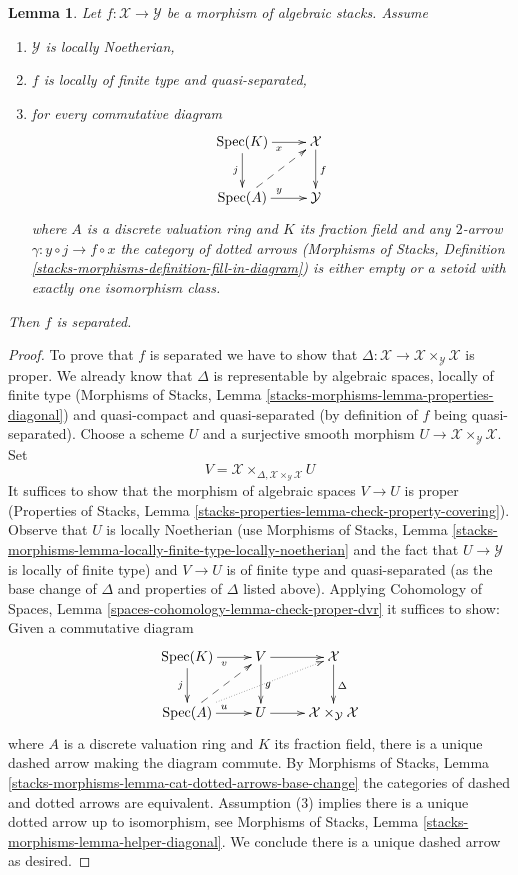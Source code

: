 \documentclass[10pt,a4paper]{amsart}
\theoremstyle{plain}
\newtheorem{lemma}[subsection]{Lemma}
\theoremstyle{definition}
\theoremstyle{remark}
\numberwithin{equation}{subsection}
\def\Spec{\mathop{\mathrm{Spec}}}
\begin{document}
\begin{lemma}
\label{lemma-check-separated-dvr}
Let $f : \mathcal{X} \to \mathcal{Y}$ be a morphism of algebraic stacks. Assume
\begin{enumerate}
\item $\mathcal{Y}$ is locally Noetherian,
\item $f$ is locally of finite type and quasi-separated,
\item for every commutative diagram
$$
\xymatrix{
\Spec(K) \ar[r]_x \ar[d]_j & \mathcal{X} \ar[d]^f \\
\Spec(A) \ar[r]^y \ar@{-->}[ru] & \mathcal{Y}
}
$$
where $A$ is a discrete valuation ring and $K$ its fraction field
and any $2$-arrow $\gamma : y \circ j \to f \circ x$ the category
of dotted arrows (Morphisms of Stacks, Definition
\ref{stacks-morphisms-definition-fill-in-diagram})
is either empty or a setoid with exactly one isomorphism class.
\end{enumerate}
Then $f$ is separated.
\end{lemma}

\begin{proof}
To prove that $f$ is separated we have to show that
$\Delta : \mathcal{X} \to \mathcal{X} \times_\mathcal{Y} \mathcal{X}$
is proper. We already know that $\Delta$ is representable by
algebraic spaces, locally of finite type (Morphisms of Stacks,
Lemma \ref{stacks-morphisms-lemma-properties-diagonal}) and
quasi-compact and quasi-separated (by definition of $f$ being quasi-separated).
Choose a scheme $U$ and a surjective smooth morphism
$U \to \mathcal{X} \times_\mathcal{Y} \mathcal{X}$.
Set
$$
V = \mathcal{X} \times_{\Delta, \mathcal{X} \times_\mathcal{Y} \mathcal{X}} U
$$
It suffices to show that the morphism of algebraic spaces $V \to U$
is proper (Properties of Stacks, Lemma
\ref{stacks-properties-lemma-check-property-covering}).
Observe that $U$ is locally Noetherian
(use Morphisms of Stacks, Lemma
\ref{stacks-morphisms-lemma-locally-finite-type-locally-noetherian}
and the fact that $U \to \mathcal{Y}$ is locally of finite type)
and $V \to U$
is of finite type and quasi-separated (as the base change
of $\Delta$ and properties of $\Delta$ listed above). Applying
Cohomology of Spaces, Lemma \ref{spaces-cohomology-lemma-check-proper-dvr}
it suffices to show: Given a commutative diagram
$$
\xymatrix{
\Spec(K) \ar[r]_v \ar[d]_j &
V \ar[d]^g \ar[r] &
\mathcal{X} \ar[d]^\Delta \\
\Spec(A) \ar[r]^u \ar@{-->}[ru] \ar@{..>}[rru] &
U \ar[r] &
\mathcal{X} \times_\mathcal{Y} \mathcal{X}
}
$$
where $A$ is a discrete valuation ring and $K$ its fraction field,
there is a unique dashed arrow making the diagram commute.
By Morphisms of Stacks, Lemma
\ref{stacks-morphisms-lemma-cat-dotted-arrows-base-change}
the categories of dashed and dotted arrows are equivalent.
Assumption (3) implies there is a unique dotted arrow up to
isomorphism, see Morphisms of Stacks, Lemma
\ref{stacks-morphisms-lemma-helper-diagonal}. We conclude
there is a unique dashed arrow as desired.
\end{proof}
\end{document}
